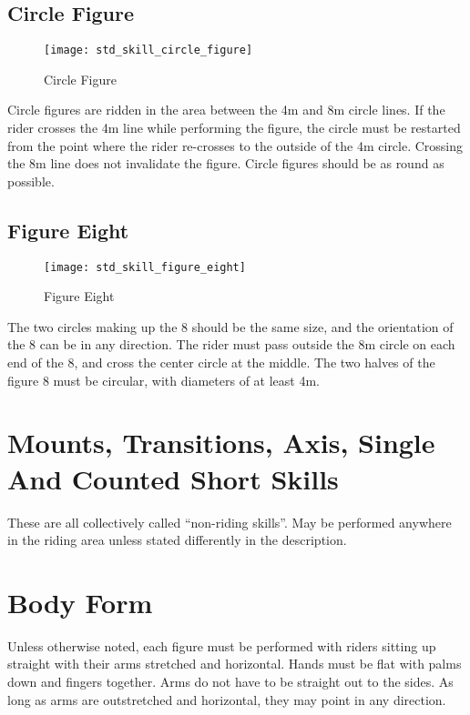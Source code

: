\subsection{Circle Figure}
\begin{wrapfigure}{r}{0.35\textwidth}
\vspace{-75pt}
\begin{center}
\texttt{[image: std\_skill\_circle\_figure]}
\end{center}
\vspace{-20pt}
\caption{Circle Figure\label{fig:std_skill_circle_figure}}
\vspace{-10pt}
\end{wrapfigure}
Circle figures are ridden in the area between the 4m and 8m circle lines.
If the rider crosses the 4m line while performing the figure, the circle must be restarted from the point where the rider re-crosses to the outside of the 4m circle.
Crossing the 8m line does not invalidate the figure.
Circle figures should be as round as possible.

\subsection{Figure Eight}
\begin{wrapfigure}{r}{0.35\textwidth}
\vspace{-45pt}
\begin{center}
\texttt{[image: std\_skill\_figure\_eight]}
\end{center}
\vspace{-20pt}
\caption{Figure Eight\label{fig:std_skill_figure_eight}}
\vspace{-10pt}
\end{wrapfigure}
The two circles making up the 8 should be the same size, and the orientation of the 8 can be in any direction.
The rider must pass outside the 8m circle on each end of the 8, and cross the center circle at the middle.
The two halves of the figure 8 must be circular, with diameters of at least 4m.

\section{Mounts, Transitions, Axis, Single And Counted Short Skills}
These are all collectively called ``non-riding skills''.
May be performed anywhere in the riding area unless stated differently in the description.

\section{Body Form}
Unless otherwise noted, each figure must be performed with riders sitting up straight with their arms stretched and horizontal.
Hands must be flat with palms down and fingers together.
Arms do not have to be straight out to the sides.
As long as arms are outstretched and horizontal, they may point in any direction.

